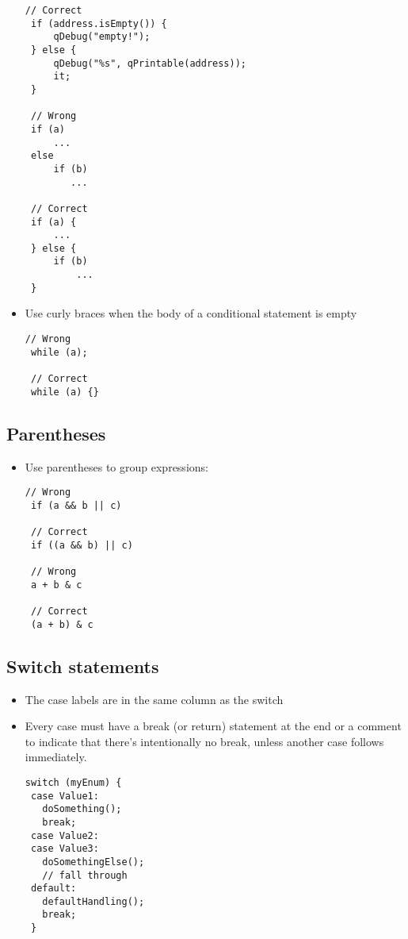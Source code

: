 \documentclass[a4paper,12pt]{article}
\begin{document}
\begin{itemize}
\begin{lstlisting}[breaklines]
 // Correct
 if (address.isEmpty()) {
     qDebug("empty!");
 } else {
     qDebug("%s", qPrintable(address));
     it;
 }
 
 // Wrong
 if (a)
     ...
 else
     if (b)
        ...
 
 // Correct
 if (a) {
     ...
 } else {
     if (b)
         ...
 }
 \end{lstlisting}
\item Use curly braces when the body of a conditional statement is empty
\begin{lstlisting}[breaklines]
 // Wrong
 while (a);
 
 // Correct
 while (a) {}
 \end{lstlisting}
\end{itemize}

\subsection{Parentheses}
\begin{itemize}
\item  Use parentheses to group expressions:
\begin{lstlisting}[breaklines]
 // Wrong
 if (a && b || c)
 
 // Correct
 if ((a && b) || c)
 
 // Wrong
 a + b & c
 
 // Correct
 (a + b) & c
 \end{lstlisting}
\end{itemize}


\subsection{Switch statements}
\begin{itemize}
\item  The case labels are in the same column as the switch
\item Every case must have a break (or return) statement at the end or a comment to indicate that there's intentionally no break, unless another case follows immediately.
\begin{lstlisting}[breaklines]
switch (myEnum) {
 case Value1:
   doSomething();
   break;
 case Value2:
 case Value3:
   doSomethingElse();
   // fall through
 default:
   defaultHandling();
   break;
 }
  \end{lstlisting}
\end{itemize}
\end{document}
